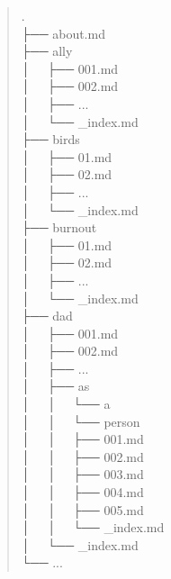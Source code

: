 \begin{verse}
\begin{spacing}{-10}
{\MonoFont
.\\
├── about.md\\
├── ally\\
│   ├── 001.md\\
│   ├── 002.md\\
│   ├── ...\\
│   └── \_index.md\\
├── birds\\
│   ├── 01.md\\
│   ├── 02.md\\
│   ├── ...\\
│   └── \_index.md\\
├── burnout\\
│   ├── 01.md\\
│   ├── 02.md\\
│   ├── ...\\
│   └── \_index.md\\
├── dad\\
│   ├── 001.md\\
│   ├── 002.md\\
│   ├── ...\\
│   ├── as\\
│   │   └── a\\
│   │       └── person\\
│   │           ├── 001.md\\
│   │           ├── 002.md\\
│   │           ├── 003.md\\
│   │           ├── 004.md\\
│   │           ├── 005.md\\
│   │           └── \_index.md\\
│   └── \_index.md\\
└── ...
}
\end{spacing}
\end{verse}
